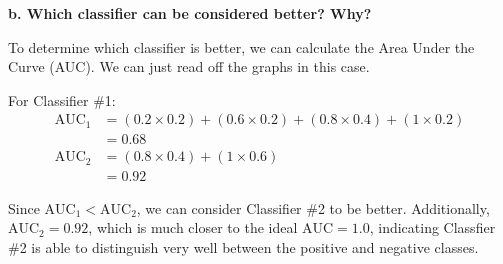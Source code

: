 \textbf{b. Which classifier can be considered better? Why?}

To determine which classifier is better, we can calculate the Area Under the Curve (AUC). We can just read off the graphs in this case.

For Classifier \#1:
\begin{align}
    \text{AUC}_1 &= (0.2\times 0.2) +(0.6\times 0.2) + (0.8\times 0.4) + (1\times 0.2) \nonumber \\
    &= 0.68 \nonumber \\
    \text{AUC}_2 &= (0.8\times 0.4) +(1\times 0.6) \nonumber \\
    &= 0.92
\end{align}

Since $\text{AUC}_1 < \text{AUC}_2$, we can consider Classifier \#2 to be better. Additionally, $\text{AUC}_2 = 0.92$, which is much closer to the ideal $\text{AUC} = 1.0$, indicating Classfier \#2 is able to distinguish very well between the positive and negative classes.